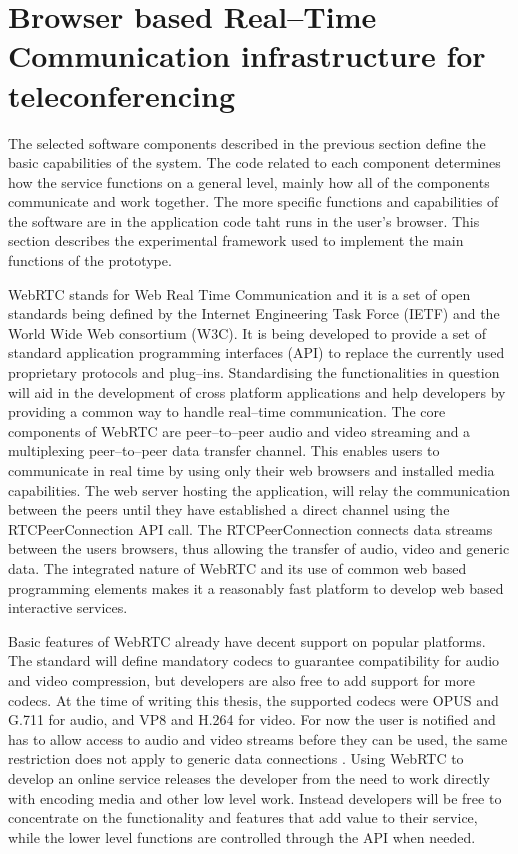 \documentclass[english,12pt,a4paper,pdftex]{article}
\begin{document}
\section{Browser based Real--Time Communication infrastructure for teleconferencing}


The selected software components described in the previous section define the basic capabilities of the system. The code related to each component determines how the service functions on a general level, mainly how all of the components communicate and work together. The more specific functions and capabilities of the software are in the application code taht runs in the user's browser. This section describes the experimental framework used to implement the main functions of the prototype.

WebRTC stands for Web Real Time Communication and it is a set of open standards being defined by the Internet Engineering Task Force (IETF) and the World Wide Web consortium (W3C). It is being developed to provide a set of standard application programming interfaces (API) to replace the currently used proprietary protocols and plug--ins. Standardising the functionalities in question will aid in the development of cross platform applications and help developers by providing a common way to handle real--time communication. The core components of WebRTC are peer--to--peer audio and video streaming and a multiplexing peer--to--peer data transfer channel. This enables users to communicate in real time by using only their web browsers and installed media capabilities. The web server hosting the application, will relay the communication between the peers until they have established a direct channel using the RTCPeerConnection API call. The RTCPeerConnection connects data streams between the users browsers, thus allowing the transfer of audio, video and generic data. \cite{Jennings} The integrated nature of WebRTC and its use of common web based programming elements makes it a reasonably fast platform to develop web based interactive services.

Basic features of WebRTC already have decent support on popular platforms. The standard will define mandatory codecs to guarantee compatibility for audio and video compression, but developers are also free to add support for more codecs. At the time of writing this thesis, the supported codecs were OPUS and G.711 for audio, and VP8 and H.264 for video. \cite{Jennings} For now the user is notified and has to allow access to audio and video streams before they can be used, the same restriction does not apply to generic data connections \cite{Johnston}. Using WebRTC to develop an online service releases the developer from the need to work directly with encoding media and other low level work. Instead developers will be free to concentrate on the functionality and features that add value to their service, while the lower level functions are controlled through the API when needed.
\end{document}
